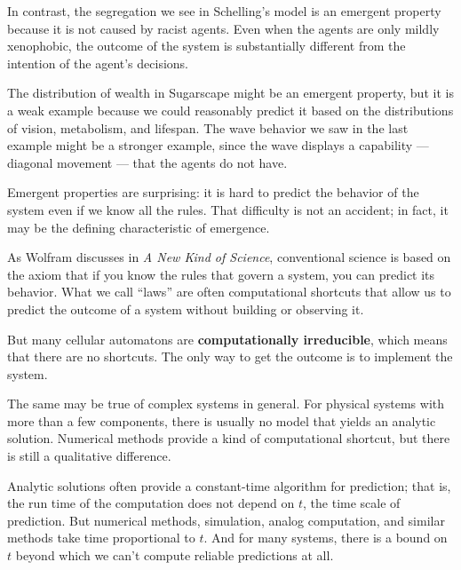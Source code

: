 \documentclass[12pt]{book}
\theoremstyle{exercise}
\begin{document}

In contrast, the segregation we see in Schelling's model is an emergent
property because it is not caused by racist agents.  Even when the
agents are only mildly xenophobic, the outcome of the system is
substantially different from the intention of the agent's decisions.


The distribution of wealth in Sugarscape might be an emergent
property, but it is a weak example because we could
reasonably predict it based on the distributions of vision, metabolism,
and lifespan.  The wave behavior we saw in the last example might
be a stronger example, since the wave displays a capability --- diagonal
movement --- that the agents do not have.

Emergent properties are surprising: it is hard to predict the behavior
of the system even if we know all the rules.  That difficulty is not
an accident; in fact, it may be the defining characteristic of emergence.

As Wolfram discusses in {\em A New Kind of Science}, conventional science
is based on the axiom that if you know the rules that govern a system,
you can predict its behavior.  What we call ``laws'' are often
computational shortcuts that allow us to predict the outcome of a
system without building or observing it.


But many cellular automatons are {\bf computationally irreducible},
which means that there are no shortcuts.  The only way to get the
outcome is to implement the system.


The same may be true of complex systems in general.  For physical
systems with more than a few components, there is usually no model
that yields an analytic solution.  Numerical methods provide a kind of
computational shortcut, but there is still a qualitative difference.


Analytic solutions often provide a constant-time algorithm for
prediction; that is, the run time of the computation does not depend
on $t$, the time scale of prediction.  But numerical methods,
simulation, analog computation, and similar methods take time
proportional to $t$.  And for many systems, there is a bound on $t$
beyond which we can't compute reliable predictions at all.
\end{document}
